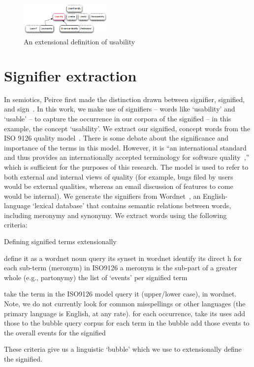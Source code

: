 \documentclass[conference, compsoc]{IEEEtran}
\begin{document}
\begin{figure}[b]
\centering
\includegraphics[width=0.4\textwidth]{synonym-graph.png}
\caption{An extensional definition of usability}
\label{fig:syngraph}
\end{figure}
	
	
\section{Signifier extraction} %
In semiotics, Peirce first made the distinction drawn between signifier, signified, and sign~\cite{atkin2006}. In this work, we make use of signifiers -- words like `usability' and `usable' -- to capture the occurrence in our corpora of the signified -- in this example, the concept `usability'. We extract our signified, concept words from the ISO 9126 quality model~\cite{iso9126}. There is some debate about the significance and importance of the terms in this model. However, it is ``an international standard and thus provides an internationally accepted terminology for software quality~\cite[p. 58]{Boegh2008},'' which is sufficient for the purposes of this research. The model is used to refer to both external and internal views of quality (for example, bugs filed by users would be external qualities, whereas an email discussion of features to come would be internal). We generate the signifiers from Wordnet~\cite{Fellbaum1998}, an English-language `lexical database' that contains semantic relations between words, including meronymy and synonymy. We extract words using the following criteria: 
\begin{algorithmic}
	\caption{Defining signified terms extensionally}
	\STATE define it as a wordnet noun
	\STATE query its synset in wordnet
	\STATE identify its direct h
	\STATE for each sub-term (meronym) in ISO9126 
	\COMMENT a meronym is the sub-part of a greater whole (e.g., partonymy)
	\ENDFOR
	\RETURN the list of `events' per signified term
	
take the term in the ISO9126 model
query it (upper/lower case), in wordnet. Note, we do not currently look for common misspellings or other languages (the primary language is English, at any rate).
for each occurrence, take its uses
add those to the bubble
query corpus for each term in the bubble
	add those events to the overall events for the signified

\end{algorithmic}
These criteria give us a linguistic `bubble' which we use to extensionally define the signified.
\end{document}
